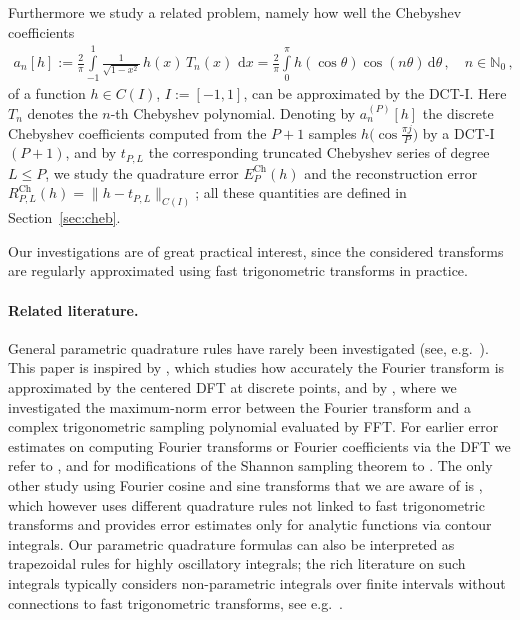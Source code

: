 \documentclass[11pt,a4paper]{scrartcl}
\renewcommand{\d}{\,\mathrm{d}}
\numberwithin{equation}{section}
\numberwithin{table}{section}
\numberwithin{figure}{section}
\newcommand{\Np}{{\mathbb N}_0}
\newcommand{\Ech}{E^{\mathrm{Ch}}}
\newcommand{\Rch}{R^{\mathrm{Ch}}}
\begin{document}
Furthermore we study a related problem, namely how well the Chebyshev coefficients
\begin{align}\label{eq:an1}
\textstyle a_n[h] :=  \textstyle \frac{2}{\pi}\int\limits_{-1}^1 \frac{1}{\sqrt{1 - x^2}}\,h(x)\,T_n(x)\,\d x
	= \frac{2}{\pi}\int\limits_0^\pi h(\cos\theta)\cos(n\theta)\d\theta\,,\quad n \in \Np\,,
\end{align}
of a function $h \in C(I)$, $I := [-1,1]$, can be approximated by the DCT-I. Here $T_n$ denotes the
$n$-th Chebyshev polynomial. Denoting by $a_n^{(P)}[h]$ the discrete Chebyshev coefficients
computed from the $P+1$ samples $h\big(\cos\frac{\pi j}{P}\big)$ by a DCT-I$(P+1)$, and by
$t_{P,L}$ the corresponding truncated Chebyshev series of degree $L \le P$, we study the quadrature
error $\Ech_P(h)$ and the reconstruction error $\Rch_{P,L}(h) = \|h-t_{P,L}\|_{C(I)}$; all these
quantities are defined in Section~\ref{sec:cheb}.

Our investigations are of great practical interest, since the considered transforms are regularly
approximated using fast trigonometric transforms in practice.

\paragraph{Related literature.} General parametric quadrature rules have rarely been
investigated (see, e.g.\ \cite{Ga19}). This paper is inspired by \cite{EhGrKl24}, which studies how
accurately the Fourier transform is approximated by the centered DFT at discrete points, and by
\cite{PoTa26}, where we investigated the maximum-norm error between the Fourier transform and a
complex trigonometric sampling polynomial evaluated by FFT. For earlier error estimates on
computing Fourier transforms or Fourier coefficients via the DFT we refer to
\cite{Auslander89, Becker96, Epstein05}, and for modifications of the Shannon sampling theorem to
\cite{Kircheis22,Kircheis24}. The only other study using Fourier cosine and sine transforms that we
are aware of is \cite{Denich24}, which however uses different quadrature rules not linked to fast
trigonometric transforms and provides error estimates only for analytic functions via contour
integrals. Our parametric quadrature formulas can also be interpreted as trapezoidal rules for
highly oscillatory integrals; the rich literature on such integrals typically considers
non-parametric integrals over finite intervals without connections to fast trigonometric
transforms, see e.g.\ \cite{Huy09, Iserles04, IserlesN04}.
\end{document}

